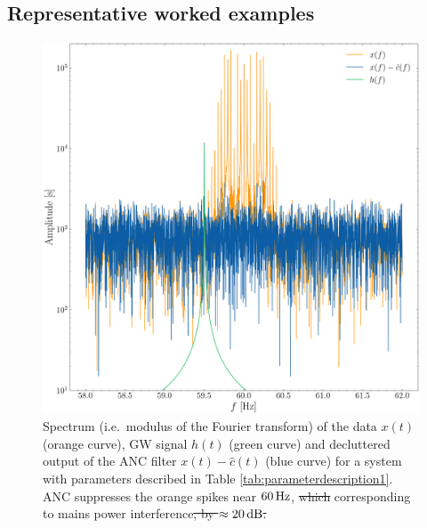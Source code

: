 \documentclass[pra,superscriptaddress,reprint,amsmath,amssymb,nofootinbib]{revtex4-2}
\providecommand{\DIFaddtex}[1]{{\protect\color{blue}\uwave{#1}}} %
\providecommand{\DIFdeltex}[1]{{\protect\color{red}\sout{#1}}}                      %
\providecommand{\DIFaddFL}[1]{\DIFadd{#1}} %
\providecommand{\DIFdelFL}[1]{\DIFdel{#1}} %
\providecommand{\DIFaddbeginFL}{} %
\providecommand{\DIFaddendFL}{} %
\providecommand{\DIFdelbeginFL}{} %
\providecommand{\DIFdelendFL}{} %
\providecommand{\DIFadd}[1]{\texorpdfstring{\DIFaddtex{#1}}{#1}} %
\providecommand{\DIFdel}[1]{\texorpdfstring{\DIFdeltex{#1}}{}} %
\newcommand{\DIFscaledelfig}{0.5}
\newlength{\DIFdelgraphicswidth} %
\newlength{\DIFdelgraphicsheight} %
\newcommand{\DIFaddincludegraphics}[2][]{{\color{blue}\fbox{\DIFOincludegraphics[#1]{#2}}}} %
\newcommand{\DIFdelincludegraphics}[2][]{%
\sbox{\DIFdelgraphicsbox}{\DIFOincludegraphics[#1]{#2}}%
\settoboxwidth{\DIFdelgraphicswidth}{\DIFdelgraphicsbox} %
\settoboxtotalheight{\DIFdelgraphicsheight}{\DIFdelgraphicsbox} %
\scalebox{\DIFscaledelfig}{%
\parbox[b]{\DIFdelgraphicswidth}{\usebox{\DIFdelgraphicsbox}\\[-\baselineskip] \rule{\DIFdelgraphicswidth}{0em}}\llap{\resizebox{\DIFdelgraphicswidth}{\DIFdelgraphicsheight}{%
\setlength{\unitlength}{\DIFdelgraphicswidth}%
\begin{picture}(1,1)%
\thicklines\linethickness{2pt} %
{\color[rgb]{1,0,0}\put(0,0){\framebox(1,1){}}}%
{\color[rgb]{1,0,0}\put(0,0){\line( 1,1){1}}}%
{\color[rgb]{1,0,0}\put(0,1){\line(1,-1){1}}}%
\end{picture}%
}\hspace*{3pt}}} %
} %
\DeclareRobustCommand{\DIFaddbeginFL}{\DIFOaddbeginFL \let\includegraphics\DIFaddincludegraphics} %
\DeclareRobustCommand{\DIFaddendFL}{\DIFOaddendFL \let\includegraphics\DIFOincludegraphics} %
\DeclareRobustCommand{\DIFdelbeginFL}{\DIFOdelbeginFL \let\includegraphics\DIFdelincludegraphics} %
\DeclareRobustCommand{\DIFdelendFL}{\DIFOaddendFL \let\includegraphics\DIFOincludegraphics} %
\begin{document}
\subsection{Representative worked examples} \label{sec:representative_example}
\begin{figure}
	\begin{center}
		\includegraphics[width=\columnwidth]{images/spectrum.png}
	\end{center}
	\caption{Spectrum (i.e.\ modulus of the Fourier transform) of the data $x(t)$ (orange curve), GW signal $h(t)$ (green curve) and decluttered output of the ANC filter $x(t) - \hat{c}(t)$ (blue curve) for a system with parameters described in Table \ref{tab:parameterdescription1}. ANC suppresses \DIFaddbeginFL \DIFaddFL{by $\approx 20\, {\rm dB}$ }\DIFaddendFL the orange spikes near $60 \, {\rm Hz}$, \DIFdelbeginFL \DIFdelFL{which }\DIFdelendFL corresponding to mains power interference\DIFdelbeginFL \DIFdelFL{, by $\approx 20\, {\rm dB}$.}\DIFdelendFL }
	\label{fig:spectrum}
\end{figure}
\end{document}
